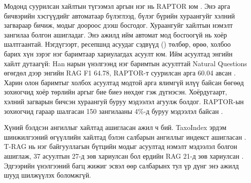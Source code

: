 Модонд суурилсан хайлтын түгээмэл аргын нэг нь RAPTOR юм \cite{sarthi2024raptor}. Энэ арга бичвэрийн хэсгүүдийг автоматаар бүлэглээд, бүлэг бүрийн хураангуйг хэлний загвараар бичиж, модыг доороос дээш босгодог. Хураангуйг хайлтын нэмэлт зангилаа болгон ашигладаг. Энэ ажилд ийм автомат мод босгоогүй нь хоёр шалтгаантай. Нэгдүгээрт, ресепшнд асуудаг сэдвүүд () төлбөр, өрөө, холбоо барих хүн зэрэг нэг баримтаар хариулагдах асуулт юм. Ийм асуултад энгийн хайлт дутаагүй: Han нарын үнэлгээнд нэг баримтын асуулттай Natural Questions өгөгдөл дээр энгийн RAG F1 64.78, RAPTOR-т суурилсан арга 60.04 авсан \cite{han2025ragvsgraphrag}. Харин олон баримтыг холбох асуултад модтой арга ялимгүй илүү байсан бөгөөд зохиогчид хоёр төрлийн аргыг бие биеэ нөхдөг гэж дүгнэсэн. Хоёрдугаарт, хэлний загварын бичсэн хураангуй буруу мэдээлэл агуулж болдог. RAPTOR-ын зохиогчид гараар шалгасан 150 зангилааны 4\%-д буруу мэдээлэл байсан \cite{sarthi2024raptor}.

Хүний бэлдсэн ангиллыг хайлтад ашигласан ажил ч бий. TaxoIndex эрдэм шинжилгээний өгүүллийн хайлтад бэлэн салбарын ангиллыг индекст ашигласан \cite{kang2024taxoindex}. T-RAG нь нэг байгууллагын бүтцийн модыг асуултад нэмэлт мэдээлэл болгон ашиглаж, 37 асуултын 27-д зөв хариулсан бол ердийн RAG 21-д зөв хариулсан \cite{fatehkia2024trag}. Эдгээрийн үнэлгээний багц жижиг эсвэл өөр салбарынх тул үр дүнг энэ ажилд шууд шилжүүлэх боломжгүй.
